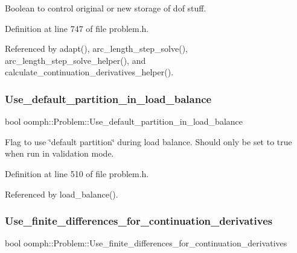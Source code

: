 Boolean to control original or new storage of dof stuff. 



Definition at line 747 of file problem.\+h.



Referenced by adapt(), arc\+\_\+length\+\_\+step\+\_\+solve(), arc\+\_\+length\+\_\+step\+\_\+solve\+\_\+helper(), and calculate\+\_\+continuation\+\_\+derivatives\+\_\+helper().

\mbox{\label{classoomph_1_1Problem_a259414329d43257a71790ac2983e32d4}} 
\subsubsection{\texorpdfstring{Use\+\_\+default\+\_\+partition\+\_\+in\+\_\+load\+\_\+balance}{Use\_default\_partition\_in\_load\_balance}}
{\footnotesize\ttfamily bool oomph\+::\+Problem\+::\+Use\+\_\+default\+\_\+partition\+\_\+in\+\_\+load\+\_\+balance\hspace{0.3cm}{\ttfamily [private]}}



Flag to use \char`\"{}default partition\char`\"{} during load balance. Should only be set to true when run in validation mode. 



Definition at line 510 of file problem.\+h.



Referenced by load\+\_\+balance().

\mbox{\label{classoomph_1_1Problem_a80dac9f70c77302805bb782cc6f1ad0f}} 
\subsubsection{\texorpdfstring{Use\+\_\+finite\+\_\+differences\+\_\+for\+\_\+continuation\+\_\+derivatives}{Use\_finite\_differences\_for\_continuation\_derivatives}}
{\footnotesize\ttfamily bool oomph\+::\+Problem\+::\+Use\+\_\+finite\+\_\+differences\+\_\+for\+\_\+continuation\+\_\+derivatives\hspace{0.3cm}{\ttfamily [protected]}}

